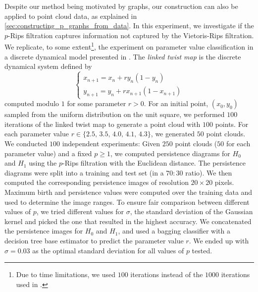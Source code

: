\documentclass[a4paper,11pt]{article}
\theoremstyle{remark}
\begin{document}
Despite our method being motivated by graphs, our construction can also be applied to point cloud data, as explained in \cref{sec:constructing_p_graphs_from_data}. In this experiment, we investigate if the $p$-Rips filtration captures information not captured by the Vietoris-Rips filtration. We replicate, to some extent\footnote{Due to time limitations, we used $100$ iterations instead of the $1000$ iterations used in \cite{adams2017}.}, the experiment on parameter value classification in a discrete dynamical model presented in \cite{adams2017}. The \textit{linked twist map} is the discrete dynamical system defined by 
\begin{equation*}
\begin{cases}
x_{n+1} = x_n + ry_n(1-y_n)\\
y_{n+1} = y_n + rx_{n+1}(1-x_{n+1})
\end{cases}
\end{equation*}
computed modulo $1$ for some parameter $r>0$. For an initial point, $(x_0, y_0)$ sampled from the uniform distribution on the unit square, we performed $100$ iterations of the linked twist map to generate a point cloud with $100$ points. For each parameter value $r\in\{2.5,\,3.5,\,4.0,\,4.1,\,4.3\}$, we generated $50$ point clouds. We conducted $100$ independent experiments: Given $250$ point clouds ($50$ for each parameter value) and a fixed $p\geq 1$, we computed persistence diagrams for $H_0$ and $H_1$ using the $p$-Rips filtration with the Euclidean distance. The persistence diagrams were split into a training and test set (in a $70:30$ ratio). We then computed the corresponding persistence images of resolution $20\times 20$ pixels. Maximum birth and persistence values were computed over the training data and used to determine the image ranges. To ensure fair comparison between different values of $p$, we tried different values for $\sigma$, the standard deviation of the Gaussian kernel and picked the one that resulted in the highest accuracy. We concatenated the persistence images for $H_0$ and $H_1$, and used a bagging classifier with a decision tree base estimator to predict the parameter value $r$. We ended up with $\sigma=0.03$ as the optimal standard deviation for all values of $p$ tested.
\end{document}

